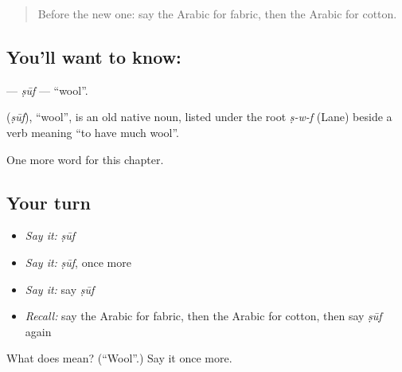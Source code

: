 \label{lesson:AR-C214-suf}



\begin{quote}
Before the new one: say the Arabic for fabric, then the Arabic for cotton.
\end{quote}

\subsection*{You'll want to know: }
\textbf{} — \emph{ṣūf} — \textquotedblleft{}wool\textquotedblright{}.

\begin{cousinweb}
\textbf{} (\emph{ṣūf}), \textquotedblleft{}wool\textquotedblright{}, is an old native noun, listed under the root \emph{ṣ-w-f} (Lane) beside a verb meaning \textquotedblleft{}to have much wool\textquotedblright{}.
\end{cousinweb}

\begin{grammarlens}[title={What you've built}]
One more word for this chapter.
\end{grammarlens}

\subsection*{Your turn}
\begin{itemize}
\raggedright
  \item \emph{Say it:} \emph{ṣūf}
  \item \emph{Say it:} \emph{ṣūf}, once more
  \item \emph{Say it:} say \emph{ṣūf}
  \item \emph{Recall:} say the Arabic for fabric, then the Arabic for cotton, then say \emph{ṣūf} again
\end{itemize}

\begin{tcolorbox}[breakable,colback=teal!4,colframe=teal!35!black,title={Before you move on}]
What does  mean? (\textquotedblleft{}Wool\textquotedblright{}.) Say it once more.
\end{tcolorbox}
